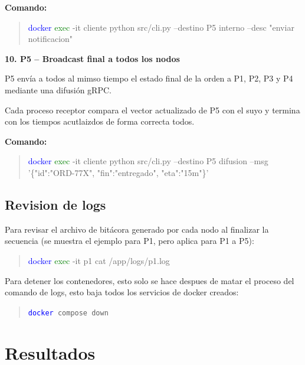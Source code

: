 \documentclass[letterpaper,11pt]{article}
\begin{document}
\newpage
\begin{center}
  \textbf{Comando:}
\end{center}

\begin{quote}
\textcolor{blue}{docker} \textcolor{green}{exec} -it cliente python src/cli.py --destino P5 interno --desc "enviar notificacion"
\end{quote}

\textbf{10. P5 -- Broadcast final a todos los nodos}

P5 envía a todos al mimso tiempo el estado final de la orden a P1, P2, P3 y P4 mediante una difusión gRPC. 

Cada proceso receptor compara el vector actualizado de P5 con el suyo y termina con los tiempos acutlaizdos de forma correcta todos.

\begin{center}
  \textbf{Comando:}
\end{center}

\begin{quote}
\textcolor{blue}{docker} \textcolor{green}{exec} -it cliente python src/cli.py --destino P5 difusion --msg '\{"id":"ORD-77X", "fin":"entregado", "eta":"15m"\}'
\end{quote}

\subsection{Revision de logs}

Para revisar el archivo de bitácora generado por cada nodo al finalizar la secuencia 
(se muestra el ejemplo para P1, pero aplica para P1 a P5):

\begin{quote}
\textcolor{blue}{docker} \textcolor{green}{exec} -it p1 cat /app/logs/p1.log
\end{quote}

Para detener los contenedores, esto solo se hace despues de matar el proceso del comando de logs, esto baja todos los servicios de docker
creados:

\begin{quote}
\texttt{\textcolor{blue}{docker} compose down}
\end{quote}

\endgroup

\newpage
\section{Resultados}
\end{document}

